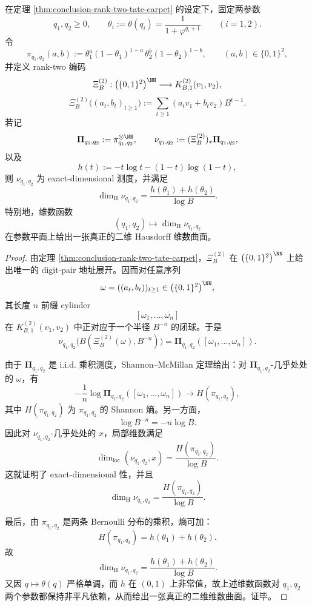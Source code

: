 \begin{theorem}\label{thm:conclusion-rank-two-tate-carpet-logistic-dimension-surface}
在定理 \ref{thm:conclusion-rank-two-tate-carpet} 的设定下，固定两参数
\[
q_1,q_2\ge 0,
\qquad
\theta_i:=\theta(q_i)=\frac{1}{1+\varphi^{q_i+1}}
\qquad(i=1,2).
\]
令
\[
\pi_{q_1,q_2}(a,b)
:=
\theta_1^a(1-\theta_1)^{1-a}\,
\theta_2^b(1-\theta_2)^{1-b},
\qquad
(a,b)\in\{0,1\}^2,
\]
并定义 rank-two 编码
\[
\Xi_B^{(2)}:\bigl(\{0,1\}^2\bigr)^{\NN}\longrightarrow K_{B,1}^{(2)}(v_1,v_2),
\]
\[
\Xi_B^{(2)}\bigl((a_t,b_t)_{t\ge 1}\bigr)
:=
\sum_{t\ge 1}(a_t v_1+b_t v_2)B^{t-1}.
\]
若记
\[
\mathbf\Pi_{q_1,q_2}:=\pi_{q_1,q_2}^{\otimes \NN},
\qquad
\nu_{q_1,q_2}:=(\Xi_B^{(2)})_*\mathbf\Pi_{q_1,q_2},
\]
以及
\[
h(t):=-t\log t-(1-t)\log(1-t),
\]
则 \(\nu_{q_1,q_2}\) 为 exact-dimensional 测度，并满足
\[
\boxed{\;
\dim_{\mathrm H}\nu_{q_1,q_2}
=
\frac{h(\theta_1)+h(\theta_2)}{\log B}.\;}
\]
特别地，维数函数
\[
(q_1,q_2)\longmapsto \dim_{\mathrm H}\nu_{q_1,q_2}
\]
在参数平面上给出一张真正的二维 Hausdorff 维数曲面。
\end{theorem}
\begin{proof}
由定理 \ref{thm:conclusion-rank-two-tate-carpet}，\(\Xi_B^{(2)}\) 在 \(\bigl(\{0,1\}^2\bigr)^{\NN}\) 上给出唯一的 digit-pair 地址展开。因而对任意序列
\[
\omega=((a_t,b_t))_{t\ge 1}\in \bigl(\{0,1\}^2\bigr)^{\NN},
\]
其长度 \(n\) 前缀 cylinder
\[
[\omega_1,\dots,\omega_n]
\]
在 \(K_{B,1}^{(2)}(v_1,v_2)\) 中正对应于一个半径 \(B^{-n}\) 的闭球。于是
\[
\nu_{q_1,q_2}\bigl(B(\Xi_B^{(2)}(\omega),B^{-n})\bigr)
=
\mathbf\Pi_{q_1,q_2}([\omega_1,\dots,\omega_n]).
\]

由于 \(\mathbf\Pi_{q_1,q_2}\) 是 i.i.d. 乘积测度，Shannon--McMillan 定理给出：对 \(\mathbf\Pi_{q_1,q_2}\)-几乎处处的 \(\omega\)，有
\[
-\frac{1}{n}\log \mathbf\Pi_{q_1,q_2}([\omega_1,\dots,\omega_n])
\longrightarrow
H(\pi_{q_1,q_2}),
\]
其中 \(H(\pi_{q_1,q_2})\) 为 \(\pi_{q_1,q_2}\) 的 Shannon 熵。另一方面，
\[
\log B^{-n}=-n\log B.
\]
因此对 \(\nu_{q_1,q_2}\)-几乎处处的 \(x\)，局部维数满足
\[
\dim_{\mathrm{loc}}(\nu_{q_1,q_2},x)
=
\frac{H(\pi_{q_1,q_2})}{\log B}.
\]
这就证明了 exact-dimensional 性，并且
\[
\dim_{\mathrm H}\nu_{q_1,q_2}
=
\frac{H(\pi_{q_1,q_2})}{\log B}.
\]

最后，由 \(\pi_{q_1,q_2}\) 是两条 Bernoulli 分布的乘积，熵可加：
\[
H(\pi_{q_1,q_2})=h(\theta_1)+h(\theta_2).
\]
故
\[
\dim_{\mathrm H}\nu_{q_1,q_2}
=
\frac{h(\theta_1)+h(\theta_2)}{\log B}.
\]
又因 \(q\mapsto \theta(q)\) 严格单调，而 \(h\) 在 \((0,1)\) 上非常值，故上述维数函数对 \(q_1,q_2\) 两个参数都保持非平凡依赖，从而给出一张真正的二维维数曲面。证毕。
\end{proof}

